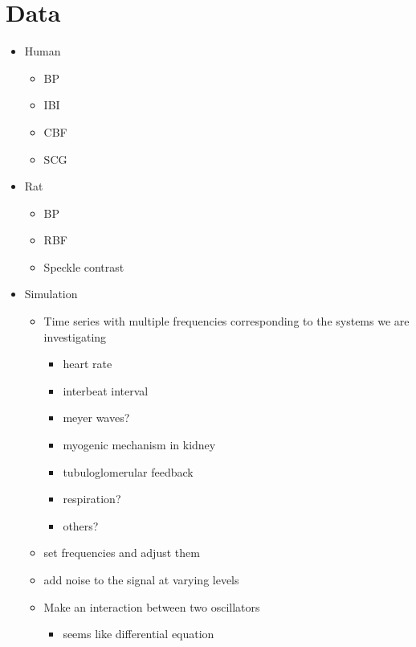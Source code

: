 \documentclass{article}
\begin{document}
\section{Data}
\begin{itemize}
\item Human
\begin{itemize}
\item BP
\item IBI
\item CBF
\item SCG
\end{itemize}
\item Rat
\begin{itemize}
\item BP
\item RBF
\item Speckle contrast
\end{itemize}
\item Simulation
\begin{itemize}
\item Time series with multiple frequencies corresponding to the systems we are investigating
\begin{itemize}
\item{heart rate}
\item{interbeat interval}
\item{meyer waves?}
\item{myogenic mechanism in kidney}
\item{tubuloglomerular feedback}
\item{respiration?}
\item{others?}
\end{itemize}
\item{set frequencies and adjust them}
\item{add noise to the signal at varying levels}
\item{Make an interaction between two oscillators}
\begin{itemize}
\item{seems like differential equation}
\end{itemize}
\end{itemize}
\end{itemize}
\end{document}
